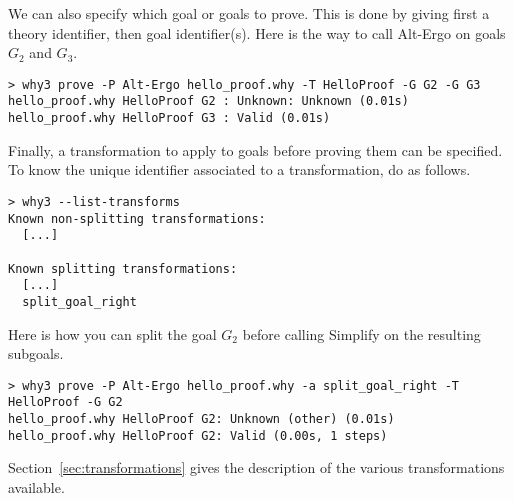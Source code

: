 We can also specify which goal or goals to prove. This is done by giving
first a theory identifier, then goal identifier(s). Here is the way to
call Alt-Ergo on goals $G_2$ and $G_3$.
\begin{verbatim}
> why3 prove -P Alt-Ergo hello_proof.why -T HelloProof -G G2 -G G3
hello_proof.why HelloProof G2 : Unknown: Unknown (0.01s)
hello_proof.why HelloProof G3 : Valid (0.01s)
\end{verbatim}

Finally, a transformation to apply to goals before proving them can be
specified. To know the unique identifier associated to
a transformation, do as follows.
\begin{verbatim}
> why3 --list-transforms
Known non-splitting transformations:
  [...]

Known splitting transformations:
  [...]
  split_goal_right
\end{verbatim}
Here is how you can split the goal $G_2$ before calling
Simplify on the resulting subgoals.
\begin{verbatim}
> why3 prove -P Alt-Ergo hello_proof.why -a split_goal_right -T HelloProof -G G2
hello_proof.why HelloProof G2: Unknown (other) (0.01s)
hello_proof.why HelloProof G2: Valid (0.00s, 1 steps)
\end{verbatim}
Section~\ref{sec:transformations} gives the description of the various
transformations available.


